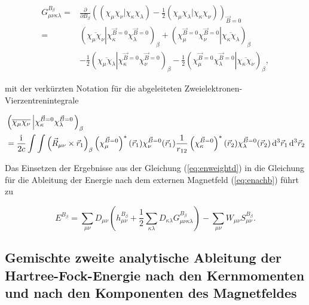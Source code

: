   	 \begin{equation}\label{gmunukaladb}
  	 \begin{aligned}
  	 G_{\mu\nu\kappa\lambda}^{B_\beta}=&\frac{\partial}{\partial B_\beta}\left((\chi_\mu\chi_\nu\vert\chi_\kappa\chi_\lambda)-\frac{1}{2}(\chi_\mu\chi_\lambda\vert\chi_\kappa\chi_\nu)\right)_{\vec{B}=0}\\
  	 =&\left(\overline{\chi_\mu\chi_\nu}\left\vert\chi_\kappa^{\vec{B}=0}\chi_\lambda^{\vec{B}=0}\right.\right)_\beta
  	 +\left(\left.\chi_\mu^{\vec{B}=0}\chi_\nu^{\vec{B}=0}\right\vert\overline{\chi_\kappa\chi_\lambda}\right)_\beta\\
  	 &-\frac{1}{2}\left(\overline{\chi_\mu\chi_\lambda}\left\vert\chi_\kappa^{\vec{B}=0}\chi_\nu^{\vec{B}=0}\right.\right)_\beta
  	 -\frac{1}{2}\left(\left.\chi_\mu^{\vec{B}=0}\chi_\lambda^{\vec{B}=0}\right\vert\overline{\chi_\kappa\chi_\nu}\right)_\beta,
  	 \end{aligned}
     \end{equation}  	  
	
	mit der verkürzten Notation für die abgeleiteten Zweielektronen-Vierzentrenintegrale
	
	\begin{equation}
	\begin{aligned}
	&\left(\overline{\chi_\mu\chi_\nu}\left\vert\chi_\kappa^{\vec{B}=0}\chi_\lambda^{\vec{B}=0}\right.\right)_\beta\\
	&=\frac{\mathrm{i}\mkern1mu}{2c}\int\int\left(\vec{R}_{\mu\nu}\times\vec{r}_1\right)_\beta\left(\chi_\mu^{\vec{B}=0}\right)^*(\vec{r}_1)\chi_\nu^{\vec{B}=0}(\vec{r}_1)\frac{1}{r_{12}}\left(\chi_\kappa^{\vec{B}=0}\right)^*(\vec{r}_2)\chi_\lambda^{\vec{B}=0}(\vec{r}_2)\mathop{}\!\mathrm{d^3} \vec{r}_1 \mathop{}\!\mathrm{d^3} \vec{r}_2\\
	\end{aligned}
	\end{equation}
     
    Das Einsetzen der Ergebnisse aus der Gleichung (\ref{eq:enweightd}) in die Gleichung für die Ableitung der Energie nach dem externen Magnetfeld (\ref{eq:enachb}) führt zu
    
    \begin{equation}
    E^{B_\beta}=\sum_{\mu\nu}D_{\mu\nu}\left(h_{\mu\nu}^{B_\beta}+\frac{1}{2}\sum_{\kappa\lambda}D_{\kappa\lambda}G_{\mu\nu\kappa\lambda}^{B_\beta}\right)-\sum_{\mu\nu}W_{\mu\nu}S_{\mu\nu}^{B_\beta}.
    \end{equation}
    
\subsection{Gemischte zweite analytische Ableitung der Hartree-Fock-Energie nach den Kernmomenten und nach den Komponenten des Magnetfeldes}    

